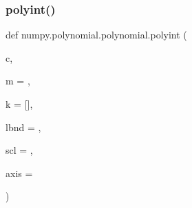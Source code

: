 \subsubsection{\texorpdfstring{polyint()}{polyint()}}
{\footnotesize\ttfamily def numpy.\+polynomial.\+polynomial.\+polyint (\begin{DoxyParamCaption}\item[{}]{c,  }\item[{}]{m = {},  }\item[{}]{k = {\ttfamily \mbox{[}\mbox{]}},  }\item[{}]{lbnd = {},  }\item[{}]{scl = {},  }\item[{}]{axis = {} }\end{DoxyParamCaption})}


